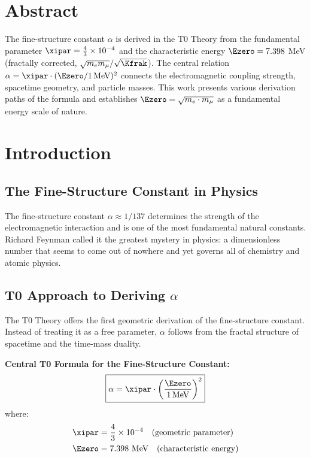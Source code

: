 \section*{Abstract}

		The fine-structure constant $\alpha$ is derived in the T0 Theory from the fundamental parameter $\xipar = \frac{4}{3} \times 10^{-4}$ and the characteristic energy $\Ezero = 7.398$ MeV (fractally corrected, $\sqrt{m_e m_\mu}/\sqrt{\Kfrak}$). The central relation $\alpha = \xipar \cdot (\Ezero/1\,\text{MeV})^2$ connects the electromagnetic coupling strength, spacetime geometry, and particle masses. This work presents various derivation paths of the formula and establishes $\Ezero = \sqrt{m_e \cdot m_\mu}$ as a fundamental energy scale of nature.

	
	
	\section{Introduction}
	
	\subsection{The Fine-Structure Constant in Physics}
	
	The fine-structure constant $\alpha \approx 1/137$ determines the strength of the electromagnetic interaction and is one of the most fundamental natural constants. Richard Feynman called it the greatest mystery in physics: a dimensionless number that seems to come out of nowhere and yet governs all of chemistry and atomic physics.
	
	\subsection{T0 Approach to Deriving $\alpha$}
	
	The T0 Theory offers the first geometric derivation of the fine-structure constant. Instead of treating it as a free parameter, $\alpha$ follows from the fractal structure of spacetime and the time-mass duality.
	
	\begin{keyresult}
		\textbf{Central T0 Formula for the Fine-Structure Constant:}
		\begin{equation}
			\boxed{\alpha = \xipar \cdot \left(\frac{\Ezero}{1\,\text{MeV}}\right)^2}
			\label{eq:alpha_main}
		\end{equation}
		where:
		\begin{align}
			\xipar &= \frac{4}{3} \times 10^{-4} \quad \text{(geometric parameter)}\\
			\Ezero &= 7.398 \text{ MeV} \quad \text{(characteristic energy)}
		\end{align}
	\end{keyresult}
	
